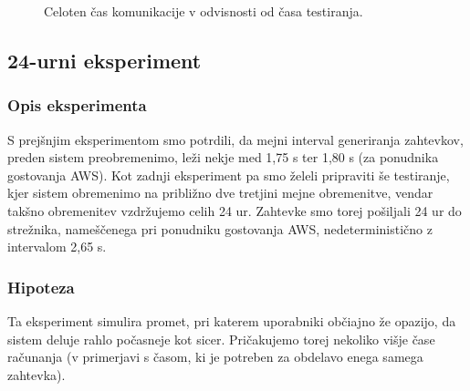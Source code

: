 \begin{figure}[H]
    \caption{Celoten čas komunikacije v odvisnosti od časa testiranja.}
    \label{fig:3_rezultati7_T1T3}
\end{figure}



\subsection{24-urni eksperiment}

\subsubsection{Opis eksperimenta}

S prejšnjim eksperimentom smo potrdili, da mejni interval generiranja zahtevkov, preden sistem preobremenimo, leži nekje med 1,75 s ter 1,80 s (za ponudnika gostovanja AWS).
Kot zadnji eksperiment pa smo želeli pripraviti še testiranje, kjer sistem obremenimo na približno dve tretjini mejne obremenitve, vendar takšno obremenitev vzdržujemo celih 24 ur.
Zahtevke smo torej pošiljali 24 ur do strežnika, nameščenega pri ponudniku gostovanja AWS, nedeterministično z intervalom 2,65 s.

\subsubsection{Hipoteza}

Ta eksperiment simulira promet, pri katerem uporabniki občiajno že opazijo, da sistem deluje rahlo počasneje kot sicer.
Pričakujemo torej nekoliko višje čase računanja (v primerjavi s časom, ki je potreben za obdelavo enega samega zahtevka).

